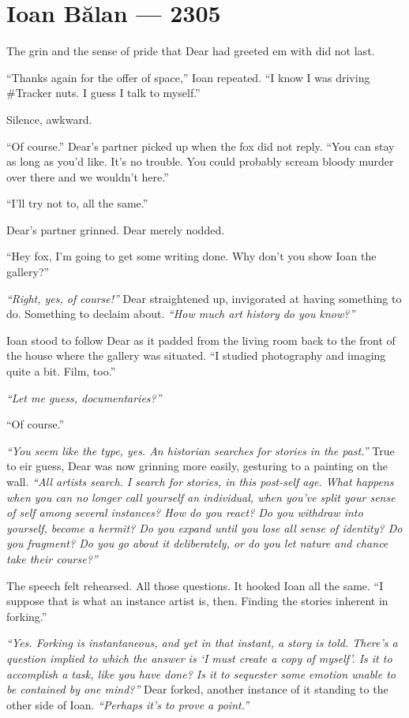 \hypertarget{ioan-bux103lan-2305}{%
\chapter*{Ioan Bălan — 2305}\label{ioan-bux103lan-2305}}

The grin and the sense of pride that Dear had greeted em with did not last.

``Thanks again for the offer of space,'' Ioan repeated. ``I know I was driving \#Tracker nuts. I guess I talk to myself.''

Silence, awkward.

``Of course.'' Dear's partner picked up when the fox did not reply. ``You can stay as long as you'd like. It's no trouble. You could probably scream bloody murder over there and we wouldn't here.''

``I'll try not to, all the same.''

Dear's partner grinned. Dear merely nodded.

``Hey fox, I'm going to get some writing done. Why don't you show Ioan the gallery?''

\emph{``Right, yes, of course!''} Dear straightened up, invigorated at having something to do. Something to declaim about. \emph{``How much art history do you know?''}

Ioan stood to follow Dear as it padded from the living room back to the front of the house where the gallery was situated. ``I studied photography and imaging quite a bit. Film, too.''

\emph{``Let me guess, documentaries?''}

``Of course.''

\emph{``You seem like the type, yes. An historian searches for stories in the past.''} True to eir guess, Dear was now grinning more easily, gesturing to a painting on the wall. \emph{``All artists search. I search for stories, in this post-self age. What happens when you can no longer call yourself an individual, when you've split your sense of self among several instances? How do you react? Do you withdraw into yourself, become a hermit? Do you expand until you lose all sense of identity? Do you fragment? Do you go about it deliberately, or do you let nature and chance take their course?''}

The speech felt rehearsed. All those questions. It hooked Ioan all the same. ``I suppose that is what an instance artist is, then. Finding the stories inherent in forking.''

\emph{``Yes. Forking is instantaneous, and yet in that instant, a story is told. There's a question implied to which the answer is `I must create a copy of myself'. Is it to accomplish a task, like you have done? Is it to sequester some emotion unable to be contained by one mind?''} Dear forked, another instance of it standing to the other side of Ioan. \emph{``Perhaps it's to prove a point.''}


